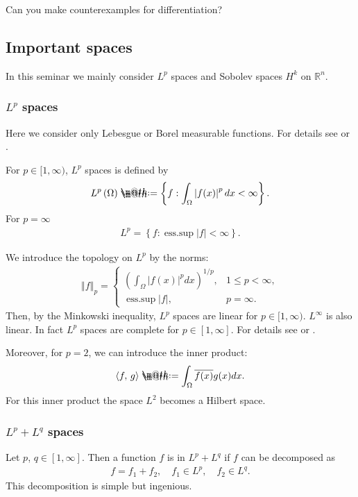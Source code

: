 \documentclass[openany, a4paper, oneside]{book}
\makeatletter
\newcommand*{\defeq}{\mathrel{\rlap{%
\raisebox{0.3ex}{$\m@th\cdot$}}%
\raisebox{-0.3ex}{$\m@th\cdot$}}%
=}
\newcommand{\esssup}{\mathop{\mathrm{ess.sup}}}
\theoremstyle{break}
\theoremstyle{breakdefn}
\newcommand{\abs}[1]{\left|#1\right|}
\newcommand{\norm}[1]{\left\Vert#1\right\Vert}
\newcommand{\rbk}[1]{\left (#1\right)}
\newcommand{\sqbk}[1]{\left[#1\right]}
\newcommand{\bkt}[2]{\left\langle#1,\,#2\right\rangle}
\newcommand{\set}[2]{\left\{#1 : #2\right\}}
\newcommand{\bbRn}{\mathbb{R}^n}
\makeatother
\begin{document}
Can you make counterexamples for differentiation?
\subsection{Important spaces}
\label{sec-7-10-2-2}

In this seminar we mainly consider $L^p$ spaces and Sobolev spaces $H^k$ on $\bbRn$.
\subsubsection{$L^p$ spaces}
\label{sec-7-10-2-2-1}

Here we consider only Lebesgue or Borel measurable functions.
For details see \cite{SeizoIto1} or \cite{LiebLoss1}.

For $p \in [1, \infty)$, $L^p$ spaces is defined by
\begin{align}
 L^p \rbk{\Omega}
 \defeq
 \set{f}{\int_{\Omega} \abs{f (x)}^p dx < \infty}.
\end{align}
For $p = \infty$
\begin{align}
 L^p
 =
 \set{f}{\esssup \abs{f} < \infty}.
\end{align}

We introduce the topology on $L^p$ by the norms:
\begin{align}
 \norm{f}_p
 =
 \begin{cases}
  \rbk{\int_{\Omega} \abs{f (x)}^p dx}^{1/p}, & 1 \leq p < \infty, \\
  \esssup \abs{f}, & p = \infty.
 \end{cases}
\end{align}
Then, by the Minkowski inequality, $L^p$ spaces are linear for $p \in [1, \infty)$.
$L^{\infty}$ is also linear.
In fact $L^p$ spaces are complete for $p \in \sqbk{1, \infty}$.
For details see \cite{SeizoIto1} or \cite{LiebLoss1}.

Moreover, for $p=2$, we can introduce the inner product:
\begin{align}
 \bkt{f}{g}
 \defeq
 \int_{\Omega} \overline{f (x)} g (x) dx.
\end{align}
For this inner product the space $L^2$ becomes a Hilbert space.
\subsubsection{$L^p+L^q$ spaces}
\label{sec-7-10-2-2-2}

Let $p$, $q \in \sqbk{1, \infty}$.
Then a function $f$ is in $L^p + L^q$ if $f$ can be decomposed as
\begin{align}
 f = f_1 + f_2, \quad
 f_1 \in L^p, \quad f_2 \in L^q.
\end{align}
This decomposition is simple but ingenious.
\end{document}
